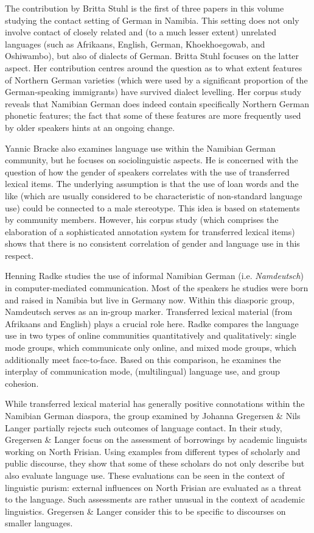 \documentclass[output=paper]{langsci/langscibook}
\begin{document}
The contribution by {Britta} {Stuhl} is the first of three papers in this volume studying the contact setting of German in Namibia. This setting does not only involve contact of closely related and (to a much lesser extent) unrelated languages (such as Afrikaans, English, German, Khoekhoegowab, and Oshiwambo), but also of dialects of German. Britta Stuhl focuses on the latter aspect. Her contribution centres around the question as to what extent features of Northern German varieties (which were used by a significant proportion of the German-speaking immigrants) have survived dialect levelling. Her corpus study reveals that Namibian German does indeed contain specifically Northern German phonetic features; the fact that some of these features are more frequently used by older speakers hints at an ongoing change. 

{Yannic} {Bracke} also examines language use within the Namibian German community, but he focuses on sociolinguistic aspects. He is concerned with the question of how the gender of speakers correlates with the use of transferred lexical items. The underlying assumption is that the use of loan words and the like (which are usually considered to be characteristic of non-standard language use) could be connected to a male stereotype. This idea is based on statements by community members. However, his corpus study (which comprises the elaboration of a sophisticated annotation system for transferred lexical items) shows that there is no consistent correlation of gender and language use in this respect. 

{Henning} {Radke} studies the use of informal Namibian German (i.e. \textit{Namdeutsch}) in computer-mediated communication. Most of the speakers he studies were born and raised in Namibia but live in Germany now. Within this diasporic group, Namdeutsch serves as an in-group marker. Transferred lexical material (from Afrikaans and English) plays a crucial role here. Radke compares the language use in two types of online communities quantitatively and qualitatively: single mode groups, which communicate only online, and mixed mode groups, which additionally meet face-to-face. Based on this comparison, he examines the interplay of communication mode, (multilingual) language use, and group cohesion.

While transferred lexical material has generally positive connotations within the Namibian German diaspora, the group examined by {Johanna} {Gregersen} {\&}  {Nils} {Langer} partially rejects such outcomes of language contact. In their study, Gregersen \& Langer focus on the assessment of borrowings by academic linguists working on North Frisian. Using examples from different types of scholarly and public discourse, they show that some of these scholars do not only describe but also evaluate language use. These evaluations can be seen in the context of linguistic purism: external influences on North Frisian are evaluated as a threat to the language. Such assessments are rather unusual in the context of academic linguistics. Gregersen \& Langer consider this to be specific to discourses on smaller languages.
\end{document}
